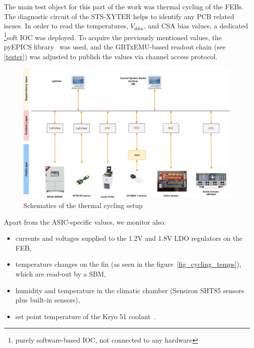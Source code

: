 The main test object for this part of the work was thermal cycling of the \gls{FEB}s. The diagnostic circuit of the \gls{STS}-XYTER helps to identify any \gls{PCB} related issues. In order to read the temperatures, $V_{ddm}$, and  \gls{CSA} bias values, a dedicated \footnote{purely software-based \gls{IOC}, not connected to any hardware}{soft IOC} was deployed. To acquire the previously mentioned values, the pyEPICS library~\cite{pyEPICS} was used, and the GBTxEMU-based readout chain (see \autoref{tester}) was adjusted to publish the values via channel access protocol. 
\begin{figure}[!h]
\centering
\includegraphics[width=0.95\columnwidth]{Chapter3/Cycling/Images/cycling_scheme.png}
\caption{Schematics of the thermal cycling setup}
\label{fig_setup}
\end{figure}
\newpage
Apart from the \gls{ASIC}-specific values, we monitor also:
\begin{itemize}
    \item currents and voltages supplied to the 1.2V and 1.8V \gls{LDO} regulators on the \gls{FEB}, 
    \item temperature changes on the fin (as seen in the figure~\ref{fig_cycling_temps}), which are read-out by a \gls{SBM},
    \item humidity and temperature in the climatic chamber (Sensiron SHT85 sensors plus built-in sensors),
    \item set point temperature of the Kryo 51 coolant~\cite{KRYO}.
\end{itemize}

